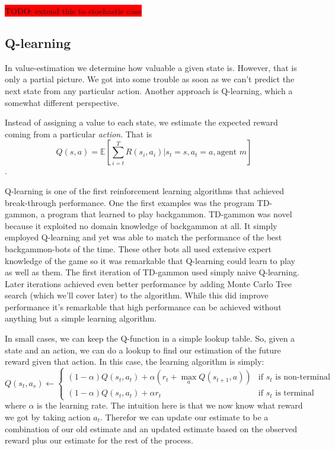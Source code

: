 \documentclass{article}
\theoremstyle{changedot}
\theoremstyle{changedotbreak}
\theoremstyle{nonumberplain}
\begin{document}
\colorbox{red}{TODO: extend this to stochastic case}

\subsection{Q-learning}
In value-estimation we determine how valuable a given state is. However, that is only a partial picture. We got into some trouble as soon as we can't predict the next state from any particular action. Another approach is Q-learning, which a somewhat different perspective.

Instead of assigning a value to each state, we estimate the expected reward coming from a particular \emph{action}. That is
\[Q(s, a) = \mathbb{E}[\sum_{i=t}^{T} R(s_{i}, a_{i}) | s_{t}=s, a_{t}=a, \text{agent } m]\].

Q-learning is one of the first reinforcement learning algorithms that achieved break-through performance. One the first examples was the program TD-gammon, a program that learned to play backgammon. TD-gammon was novel because it exploited no domain knowledge of backgammon at all. It simply employed Q-learning and yet was able to match the performance of the best backgammon-bots of the time. These other bots all used extensive expert knowledge of the game so it was remarkable that Q-learning could learn to play as well as them. The first iteration of TD-gammon used simply naive Q-learning. Later iterations achieved even better performance by adding Monte Carlo Tree search (which we'll cover later) to the algorithm. While this did improve performance it's remarkable that high performance can be achieved without anything but a simple learning algorithm.

In small cases, we can keep the Q-function in a simple lookup table. So, given a state and an action, we can do a lookup to find our estimation of the future reward given that action. In this case, the learning algorithm is simply:
\[Q(s_{t}, a_{s}) \leftarrow \begin{cases} (1 - \alpha)Q(s_{t}, a_{t}) + \alpha (r_{t} + \max_{a} Q(s_{t+1}, a)) & \text{if  $s_{t}$ is non-terminal} \\ (1 - \alpha) Q(s_{t}, a_{t}) + \alpha r_{t} & \text{if $s_{t}$ is terminal} \end{cases}\]
where $\alpha$ is the learning rate. The intuition here is that we now know what reward we got by taking action $a_{t}$. Therefor we can update our estimate to be a combination of our old estimate and an updated estimate based on the observed reward plus our estimate for the rest of the process.
\end{document}
